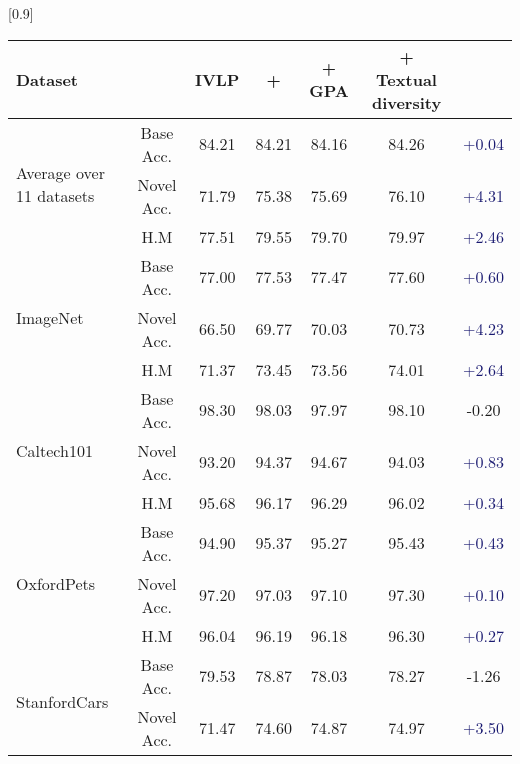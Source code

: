 \documentclass[10pt,twocolumn,letterpaper]{article}
\begin{document}
\begin{center}
\begin{table*}[!t]
    \small \centering
 \setlength{\tabcolsep}{12pt}
    \scalebox{0.9}[0.9]{
\begin{tabular}{lc|cccc|c}
\toprule
\textbf{Dataset} & 
 & 
\textbf{IVLP} &
\textbf{+ } & 
\textbf{+ GPA} & 
\textbf{ + Textual diversity} &
\textbf{} \\ \midrule
\multirow{3}{*}{Average over 11 datasets}  & Base Acc.& 84.21       & 84.21   & 84.16  & 84.26 &   \textcolor{MidnightBlue}{{+0.04}}\\
                               & Novel Acc.     & 71.79  & 75.38   & 75.69  & 76.10  &   \textcolor{MidnightBlue}{{+4.31}}\\
                               & H.M            & 77.51  & 79.55   & 79.70 &79.97  &   \textcolor{MidnightBlue}{{+2.46}}\\
\midrule
\multirow{3}{*}{ImageNet}      & Base Acc.      & 77.00  & 77.53   &  77.47 &  77.60 &  \textcolor{MidnightBlue}{{+0.60}}\\ 
                               & Novel Acc.     & 66.50  & 69.77   &  70.03 & 70.73&    \textcolor{MidnightBlue}{{+4.23}}\\ 
                               & H.M            & 71.37  & 73.45   &  73.56 & 74.01&  \textcolor{MidnightBlue}{{+2.64}}\\
\midrule
\multirow{3}{*}{Caltech101}    & Base Acc.      & 98.30  & 98.03   & 97.97 & 98.10 &   \textcolor{Bittersweet}{{-0.20}}\\
                               & Novel Acc.     & 93.20  & 94.37   &  94.67 & 94.03 & \textcolor{MidnightBlue}{{+0.83}}\\
                               & H.M            & 95.68  & 96.17   &  96.29 &  96.02 &  \textcolor{MidnightBlue}{{+0.34}}\\
\midrule
\multirow{3}{*}{OxfordPets}    & Base Acc.      & 94.90  & 95.37   & 95.27 & {95.43}   &  \textcolor{MidnightBlue}{{+0.43}}\\
                               & Novel Acc.     & 97.20  & 97.03   & {97.10} & {97.30}  &   \textcolor{MidnightBlue}{{+0.10}}\\
                               & H.M            & 96.04  & 96.19   & {96.18} & {96.30}  &   \textcolor{MidnightBlue}{{+0.27}}\\
\midrule
\multirow{3}{*}{StanfordCars}  & Base Acc.     & 79.53 & 78.87    & 78.03 &78.27 &  \textcolor{Bittersweet}{{-1.26}}\\
                           & Novel Acc.         & 71.47 & 74.60    & 74.87&74.97   &  \textcolor{MidnightBlue}{{+3.50}}\\

\end{tabular}}
\end{table*}
\end{center}
\end{document}
